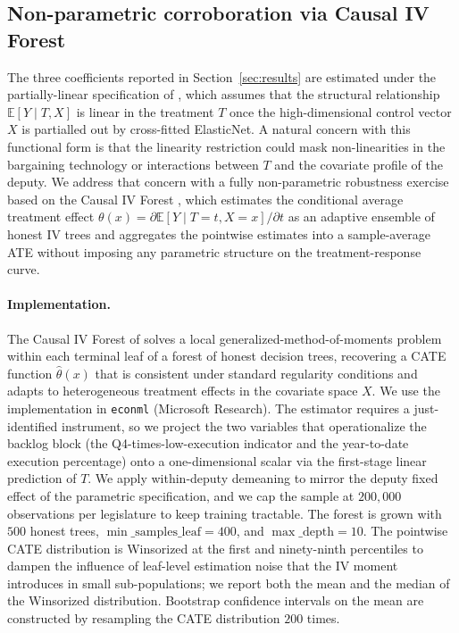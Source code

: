 \documentclass[preprint,12pt,authoryear]{elsarticle}
\begin{document}
\subsection{Non-parametric corroboration via Causal IV Forest}
\label{app:cforest}

The three coefficients reported in Section~\ref{sec:results} are estimated under the partially-linear specification of \citet{Chernozhukov2018}, which assumes that the structural relationship $\mathbb{E}[Y \mid T, X]$ is linear in the treatment $T$ once the high-dimensional control vector $X$ is partialled out by cross-fitted ElasticNet. A natural concern with this functional form is that the linearity restriction could mask non-linearities in the bargaining technology or interactions between $T$ and the covariate profile of the deputy. We address that concern with a fully non-parametric robustness exercise based on the Causal IV Forest \citep{AtheyTibshiraniWager2019}, which estimates the conditional average treatment effect $\theta(x) = \partial\mathbb{E}[Y \mid T = t, X = x] / \partial t$ as an adaptive ensemble of honest IV trees and aggregates the pointwise estimates into a sample-average ATE without imposing any parametric structure on the treatment-response curve.

\paragraph{Implementation.} The Causal IV Forest of \citet{AtheyTibshiraniWager2019} solves a local generalized-method-of-moments problem within each terminal leaf of a forest of honest decision trees, recovering a CATE function $\hat\theta(x)$ that is consistent under standard regularity conditions and adapts to heterogeneous treatment effects in the covariate space $X$. We use the implementation in \texttt{econml} (Microsoft Research). The estimator requires a just-identified instrument, so we project the two variables that operationalize the backlog block (the Q4-times-low-execution indicator and the year-to-date execution percentage) onto a one-dimensional scalar via the first-stage linear prediction of $T$. We apply within-deputy demeaning to mirror the deputy fixed effect of the parametric specification, and we cap the sample at $200{,}000$ observations per legislature to keep training tractable. The forest is grown with $500$ honest trees, $\min\_\mathrm{samples\_leaf} = 400$, and $\max\_\mathrm{depth} = 10$. The pointwise CATE distribution is Winsorized at the first and ninety-ninth percentiles to dampen the influence of leaf-level estimation noise that the IV moment introduces in small sub-populations; we report both the mean and the median of the Winsorized distribution. Bootstrap confidence intervals on the mean are constructed by resampling the CATE distribution $200$ times.
\end{document}
